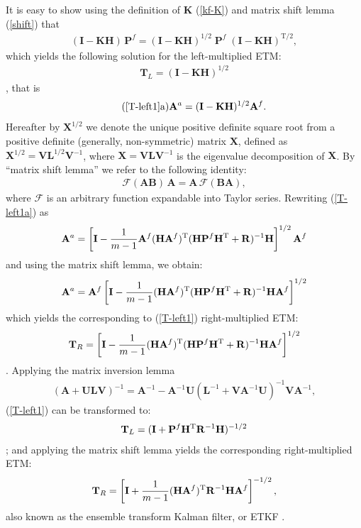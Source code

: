 \documentclass[11pt]{report}
\newcommand{\mb} {\mathbf}
\newcommand{\T}{^{\tiny \mathrm T}}
\newcommand{\TS}{^{{\mathrm T}/2}}
\begin{document}
It is easy to show using the definition of $\mb K$ (\ref{kf-K}) and matrix shift lemma (\ref{shift}) that 
\begin{align*}
    (\mb I - \mb K \mb H) \, \mb P^f = (\mb I - \mb K \mb H)^{1/2} \; \mb P^f \; (\mb I - \mb K \mb H)\TS,
\end{align*}
which yields the following solution for the left-multiplied ETM:
\begin{align}
  \label{T-left1}
  \mb T_L = (\mb I - \mb K \mb H)^{1/2}
\end{align}
\citep{sak08b}, that is
\begin{align}
  \tag{\ref{T-left1}a}
  \label{T-left1a}
  \mb A^a =  (\mb I - \mb K \mb H)^{1/2} \mb A^f.
\end{align}
Hereafter by $\mb X^{1/2}$ we denote the unique positive definite square root from a positive definite (generally, non-symmetric) matrix $\mb X$, defined as $\mb X^{1/2} = \mb V \mb L^{1/2} \mb V^{-1}$, where $\mb X = \mb V \mb L \mb V^{-1}$ is the eigenvalue decomposition of $\mb X$.
By ``matrix shift lemma'' we refer to the following identity:
\begin{align}
  \label{shift}
  \mathcal F(\mb A \mb B) \, \mb A = \mb A \, \mathcal F(\mb B \mb A),
\end{align}
where $\mathcal F$ is an arbitrary function expandable into Taylor series.
Rewriting (\ref{T-left1a}) as
\begin{align*}
  \mb A^a = \left[ \mb I - \frac{1}{m-1} \mb A^f (\mb H \mb A^f)\T  (\mb H \mb P^f \mb H\T + \mb R)^{-1} \mb H \right]^{1/2} \mb A^f
\end{align*}
and using the matrix shift lemma, we obtain:
\begin{align*}
  \mb A^a = \mb A^f \left[ \mb I - \frac{1}{m-1} (\mb H \mb A^f)\T  (\mb H \mb P^f \mb H\T + \mb R)^{-1} \mb H \mb A^f \right]^{1/2}
\end{align*}
which yields the corresponding to (\ref{T-left1}) right-multiplied ETM:
\begin{align}
  \label{T-right1}
  \mb T_R = \left[ \mb I -  \frac{1}{m-1} (\mb H \mb A^f)\T  (\mb H \mb P^f \mb H\T + \mb R)^{-1} \mb H \mb A^f \right]^{1/2}
\end{align}
\citep{eve04a}.
Applying the matrix inversion lemma
\begin{align}
  \label{inv}
  (\mb A + \mb U \mb L \mb V)^{-1} = \mb A^{-1} - \mb A^{-1} \mb U (\mb L^{-1} + \mb V \mb A^{-1} \mb U)^{-1} \mb V \mb A^{-1},
\end{align}
(\ref{T-left1}) can be transformed to:
\begin{align}
  \label{T-left2}
  \mb T_L = (\mb I + \mb P^f \mb H\T \mb R^{-1} \mb H)^{-1/2}
\end{align}
\citep{sak11a}; and applying the matrix shift lemma yields the corresponding right-multiplied ETM:
\begin{align}
  \label{etkf}
  \mb T_R = \left[\mb I +  \frac{1}{m-1} (\mb H \mb A^f)\T \mb R^{-1} \mb H \mb A^f \right]^{-1/2},
\end{align}
also known as the ensemble transform Kalman filter, or ETKF \citep{bis01a}.
\end{document}
